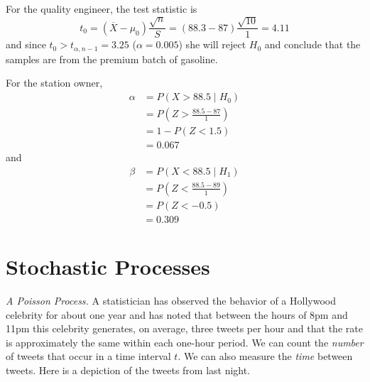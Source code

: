 For the quality engineer, the test statistic is
\[
t_0 = \left( \overline{X} - \mu_0 \right)\frac{\sqrt{n}}{S} 
= \left(88.3 - 87\right) \frac{\sqrt{10}}{1} 
 = 4.11
\]
and since $t_0 > t_{\alpha,n-1}=3.25$ ($\alpha=0.005$) she will
reject $H_0$ and conclude that the samples are from the premium
batch of gasoline.

For the station owner,
\begin{align*}
\alpha &= P(X > 88.5 \mid H_0) \\
&= P\left( Z > \frac{88.5-87}{1} \right) \\
&= 1 - P(Z < 1.5) \\
&= 0.067
\end{align*}
and
\begin{align*}
\beta &= P(X < 88.5 \mid H_1) \\
&= P\left( Z < \frac{88.5-89}{1} \right) \\
&= P(Z < -0.5) \\
&= 0.309
\end{align*}


\section{Stochastic Processes}

\emph{A Poisson Process.} A statistician has observed the behavior of
a Hollywood celebrity for about one year and has noted that between
the hours of 8pm and 11pm this celebrity generates, on average, three
tweets per hour and that the rate is approximately the same within
each one-hour period.  We can count the \emph{number} of tweets that
occur in a time interval $t$. We can also measure the \emph{time}
between tweets. Here is a depiction of the tweets from last night.

\vspace{.2in}
\begin{center}
\end{center}

